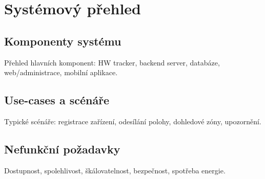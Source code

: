 \chapter{Systémový přehled}
\label{chap:prehled}

\section{Komponenty systému}
Přehled hlavních komponent: HW tracker, backend server, databáze, web/administrace, mobilní aplikace.

\section{Use-cases a scénáře}
Typické scénáře: registrace zařízení, odesílání polohy, dohledové zóny, upozornění.

\section{Nefunkční požadavky}
Dostupnost, spolehlivost, škálovatelnost, bezpečnost, spotřeba energie.
